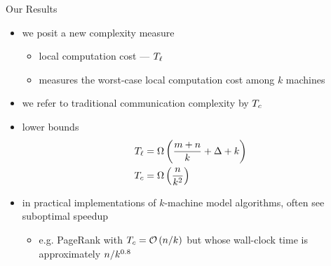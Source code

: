 \begin{frame}{Our Results}
    \begin{itemize}
        \item we posit a new complexity measure
              \begin{itemize}
                  \item \alert{local computation cost} --- $T_{\ell}$
                  \item measures the worst-case local computation cost among $k$ machines
              \end{itemize}
        \item we refer to traditional communication complexity by $T_c$
        \item lower bounds
              \begin{align*}
                  T_{\ell} & = \Omega\left(\frac{m + n}{k} + \Delta + k\right) \\
                  T_c & = \Omega\left(\frac{n}{k^2}\right)
              \end{align*}
        \item in practical implementations of $k$-machine model algorithms,
              often see suboptimal speedup
              \begin{itemize}
                  \item e.g. PageRank with $T_c = \mathcal{O}\left(n / k\right)$ but whose wall-clock
                        time is approximately $n / k^{0.8}$
              \end{itemize}
    \end{itemize}
\end{frame}


